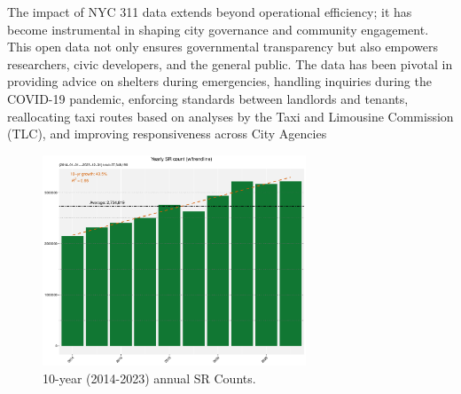 \documentclass[linenumber]{jdsart}
\begin{document}

The impact of NYC 311 data extends beyond operational efficiency; it
has become instrumental in shaping city governance and community
engagement. This open data not only ensures governmental transparency
but also empowers researchers, civic developers, and the general
public. The data has been pivotal in providing advice on shelters
during emergencies, handling inquiries during the COVID-19 pandemic,
enforcing standards between landlords and tenants, reallocating taxi
routes based on analyses by the Taxi and Limousine Commission (TLC),
and improving responsiveness across City Agencies


\begin{figure}[tbp]
	\centering
  	\includegraphics[width=0.7\textwidth]{10-year-trend_yearly.pdf}
 	\caption{10-year (2014-2023) annual SR Counts.}
  	\label{fig:10-yr}
\end{figure}
\end{document}
